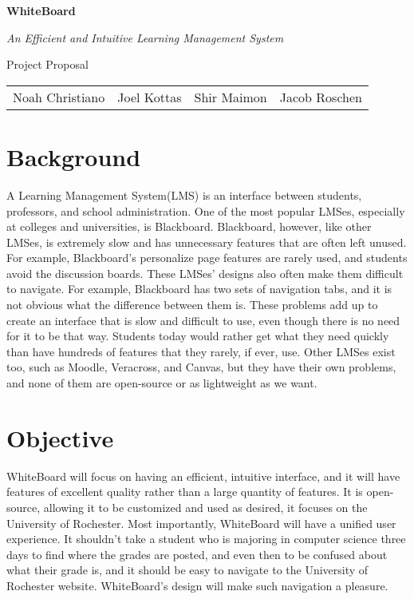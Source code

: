 \documentclass{article}
\begin{document}
\begin{center}
    \huge{\textbf{WhiteBoard}}
    
    \huge{\textit{An Efficient and Intuitive Learning Management System}}

    \huge{Project Proposal}

    \vspace{10 pt}

    \large{
        \begin{tabular}{cccc}
            Noah Christiano&Joel Kottas&Shir Maimon&Jacob Roschen\\
        \end{tabular}
    }

\end{center}

\vspace{10 pt}

\section{Background}

A Learning Management System(LMS) is an interface between students,
professors, and school administration. One of the most popular LMSes,
especially at colleges and universities, is Blackboard\cite{Blackboard}.
Blackboard, however, like other LMSes, is extremely slow and has unnecessary
features that are often left unused. For example, Blackboard’s personalize
page features are rarely used, and students avoid the discussion boards. These
LMSes’ designs also often make them difficult to navigate. For example,
Blackboard has two sets of navigation tabs, and it is not obvious what the
difference between them is. These problems add up to create an interface that
is slow and difficult to use, even though there is no need for it to be that
way. Students today would rather get what they need quickly than have hundreds
of features that they rarely, if ever, use. Other LMSes exist too, such as
Moodle\cite{Moodle}, Veracross\cite{Veracross}, and Canvas\cite{Canvas}, but
they have their own problems, and none of them are open-source or as
lightweight as we want.

\section{Objective}

WhiteBoard will focus on having an efficient, intuitive interface, and it will
have features of excellent quality rather than a large quantity of features. It
is open-source, allowing it to be customized and used as desired, it focuses on
the University of Rochester. Most importantly, WhiteBoard will have a unified
user experience. It shouldn't take a student who is majoring in computer
science three days to find where the grades are posted, and even then to be
confused about what their grade is, and it should be easy to navigate to the
University of Rochester website. WhiteBoard’s design will make such navigation
a pleasure.
\end{document}
